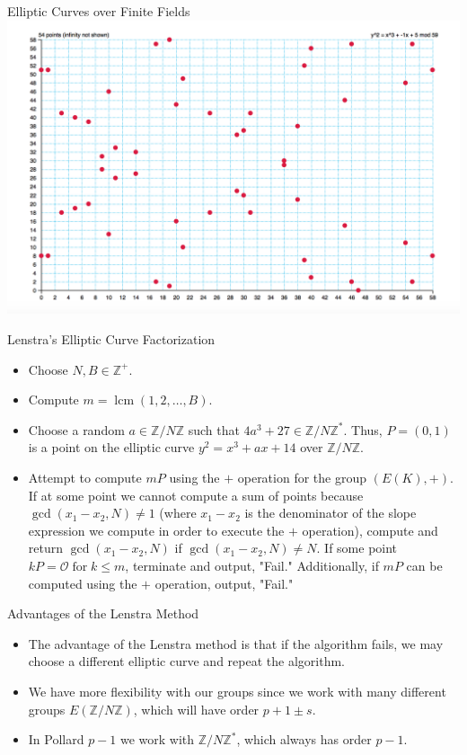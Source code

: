 \documentclass{beamer}
\DeclareMathOperator{\lcm}{lcm}
\DeclareMathOperator{\for}{for}
\begin{document}
	\begin{frame}{Elliptic Curves over Finite Fields}
		\includegraphics[scale=.4]{EllipticCurveFiniteField.png}
	\end{frame}
	
	\begin{frame}{Lenstra's Elliptic Curve Factorization}
		\begin{itemize}
			\item Choose $N, B \in \mathbb{Z}^+$.
			\item Compute $m=\lcm(1,2,\dotso,B)$. 
			\item Choose a random $a \in \mathbb{Z}/N\mathbb{Z}$ such that $4a^3+27 \in \mathbb{Z}/N\mathbb{Z}^*$. Thus, $P=(0,1)$ is a point on the elliptic curve $y^2=x^3+ax+14$ over $\mathbb{Z}/N\mathbb{Z}$.
			\item Attempt to compute $mP$ using the $+$ operation for the group $(E(K),+)$. If at some point we cannot compute a sum of points because $\gcd(x_1-x_2,N) \neq 1$ (where $x_1-x_2$ is the denominator of the slope expression we compute in order to execute the $+$ operation), compute and return $\gcd(x_1-x_2,N)$ if $\gcd(x_1-x_2,N) \neq N$. If some point $kP=\mathcal{O} \for k \leq m$, terminate and output, "Fail." Additionally, if $mP$ can be computed using the $+$ operation, output, "Fail."
		\end{itemize}
	\end{frame}
	
	\begin{frame}{Advantages of the Lenstra Method}
		\begin{itemize}
			\item The advantage of the Lenstra method is that if the algorithm fails, we may choose a different elliptic curve and repeat the algorithm.
			\item We have more flexibility with our groups since we work with many different groups $E(\mathbb{Z}/N\mathbb{Z})$, which will have order $p+1\pm s$.
			\item In Pollard $p-1$ we work with $\mathbb{Z}/N\mathbb{Z}^*$, which always has order $p-1$.
		\end{itemize}
	\end{frame}
	
\end{document}
